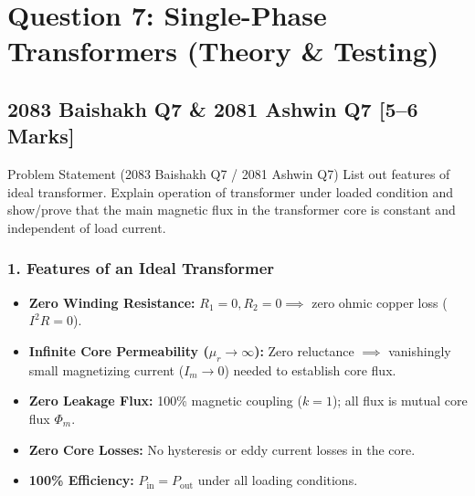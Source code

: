 \documentclass[11pt,a4paper,oneside]{article}
\begin{document}
\newpage

\section{Question 7: Single-Phase Transformers (Theory \& Testing)}

\subsection{2083 Baishakh Q7 \& 2081 Ashwin Q7 [5--6 Marks]}

\begin{questionbox}{Problem Statement (2083 Baishakh Q7 / 2081 Ashwin Q7)}
List out features of ideal transformer. Explain operation of transformer under loaded condition and show/prove that the main magnetic flux in the transformer core is constant and independent of load current.
\end{questionbox}

\subsubsection*{1. Features of an Ideal Transformer}
\begin{itemize}[leftmargin=1.5em]
  \item \textbf{Zero Winding Resistance:} $R_1 = 0, R_2 = 0 \implies$ zero ohmic copper loss ($I^2R = 0$).
  \item \textbf{Infinite Core Permeability ($\mu_r \to \infty$):} Zero reluctance $\implies$ vanishingly small magnetizing current ($I_m \to 0$) needed to establish core flux.
  \item \textbf{Zero Leakage Flux:} 100\% magnetic coupling ($k=1$); all flux is mutual core flux $\Phi_m$.
  \item \textbf{Zero Core Losses:} No hysteresis or eddy current losses in the core.
  \item \textbf{100\% Efficiency:} $P_{\text{in}} = P_{\text{out}}$ under all loading conditions.
\end{itemize}
\end{document}
